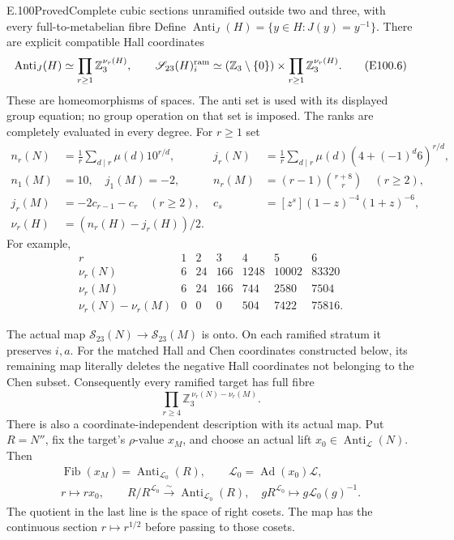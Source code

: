 \begin{statement}{E.100}{Proved}{Complete cubic sections unramified outside two and three, with every full-to-metabelian fibre}
Define $\operatorname{Anti}_J(H)=\{y\in H:J(y)=y^{-1}\}$.
There are explicit compatible Hall coordinates
\[
 \operatorname{Anti}_J(H)
       \simeq\prod_{r\ge1}\mathbb Z_3^{\nu_r(H)},\qquad
 \mathscr S_{23}(H)_i^{\rm ram}
       \simeq(\mathbb Z_3\setminus\{0\})
                       \times\prod_{r\ge1}\mathbb Z_3^{\nu_r(H)}.
 \tag{E100.6}
\]
These are homeomorphisms of spaces. The anti set is
used with its displayed group equation; no group
operation on that set is imposed.
The ranks are completely evaluated in every degree.
For $r\ge1$ set
\[
\begin{aligned}
 n_r(N)&=\frac1r\sum_{d\mid r}\mu(d)10^{r/d},&
 j_r(N)&=\frac1r\sum_{d\mid r}\mu(d)
                          (4+(-1)^d6)^{r/d},\\
 n_1(M)&=10,\quad j_1(M)=-2,&
 n_r(M)&=(r-1){r+8\choose r}\quad(r\ge2),\\
 j_r(M)&=-2c_{r-1}-c_r\quad(r\ge2),&
 c_s&=[z^s](1-z)^{-4}(1+z)^{-6},\\
 \nu_r(H)&=(n_r(H)-j_r(H))/2.&
\end{aligned}
 \tag{E100.7}
\]
For example,
\[
\begin{array}{c|rrrrrr}
 r&1&2&3&4&5&6\\\hline
 \nu_r(N)&6&24&166&1248&10002&83320\\
 \nu_r(M)&6&24&166&744&2580&7504\\
 \nu_r(N)-\nu_r(M)&0&0&0&504&7422&75816 .
\end{array}
 \tag{E100.8}
\]

The actual map $\mathscr S_{23}(N)\to\mathscr S_{23}(M)$
is onto. On each ramified stratum it preserves $i,a$.
For the matched Hall and Chen coordinates constructed
below, its remaining map literally deletes the negative
Hall coordinates not belonging to the Chen subset.
Consequently every ramified target has full fibre
\[
       \prod_{r\ge4}
           \mathbb Z_3^{\,\nu_r(N)-\nu_r(M)}.
 \tag{E100.9}
\]
There is also a coordinate-independent description
with its actual map. Put $R=N''$, fix the target's
$\rho$-value $x_M$, and choose an actual lift
$x_0\in\operatorname{Anti}_{\mathcal L}(N)$.
Then
\[
\begin{gathered}
 \operatorname{Fib}(x_M)
   =\operatorname{Anti}_{\mathcal L_0}(R),\qquad
 \mathcal L_0=\operatorname{Ad}(x_0)\mathcal L,\\
 r\longmapsto r x_0,\qquad
 R/R^{\mathcal L_0}\xrightarrow{\sim}
       \operatorname{Anti}_{\mathcal L_0}(R),\quad
 gR^{\mathcal L_0}\longmapsto g\mathcal L_0(g)^{-1}.
\end{gathered}
 \tag{E100.10}
\]
The quotient in the last line is the space of right
cosets. The map has the continuous section
$r\mapsto r^{1/2}$ before passing to those cosets.


\end{statement}
